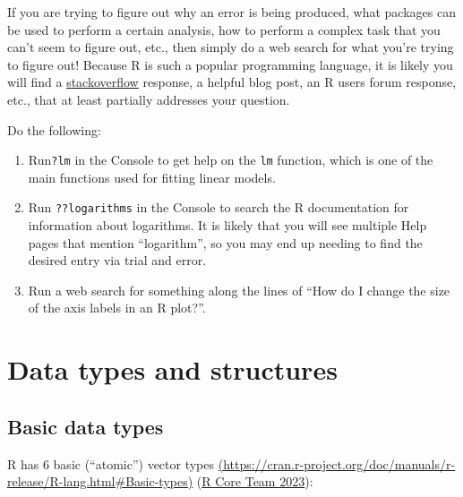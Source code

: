 \documentclass[
]{book}
\providecommand{\tightlist}{%
  \setlength{\itemsep}{0pt}\setlength{\parskip}{0pt}}
\theoremstyle{definition}
\theoremstyle{definition}
\theoremstyle{definition}
\theoremstyle{definition}
\theoremstyle{remark}
\begin{document}
If you are trying to figure out why an error is being produced, what packages can be used to perform a certain analysis, how to perform a complex task that you can't seem to figure out, etc., then simply do a web search for what you're trying to figure out! Because R is such a popular programming language, it is likely you will find a \href{https://www.stackoverflow.com}{stackoverflow} response, a helpful blog post, an R users forum response, etc., that at least partially addresses your question.

\begin{yourturn}

Do the following:

\begin{enumerate}
\def\labelenumi{\arabic{enumi}.}
\tightlist
\item
  Run\texttt{?lm} in the Console to get help on the \texttt{lm} function, which is one of the main functions used for fitting linear models.
\item
  Run \texttt{??logarithms} in the Console to search the R documentation for information about logarithms. It is likely that you will see multiple Help pages that mention ``logarithm'', so you may end up needing to find the desired entry via trial and error.
\item
  Run a web search for something along the lines of ``How do I change the size of the axis labels in an R plot?''.
\end{enumerate}

\end{yourturn}

\hypertarget{data-types-and-structures}{%
\section{Data types and structures}\label{data-types-and-structures}}

\hypertarget{basic-data-types}{%
\subsection{Basic data types}\label{basic-data-types}}

R has 6 basic (``atomic'') vector types \href{https://cran.r-project.org/doc/manuals/r-release/R-lang.html\#Basic-types}{(https://cran.r-project.org/doc/manuals/r-release/R-lang.html\#Basic-types)} (\protect\hyperlink{ref-R-base}{R Core Team 2023}):
\end{document}
